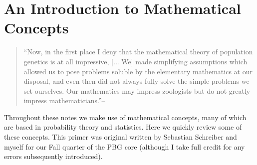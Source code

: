 % 
% 
% 


\chapter{An Introduction to Mathematical Concepts}
\begin{quote}
``Now, in the first place I deny that the mathematical theory of
population genetics is at all impressive, [... We] made simplifying assumptions which allowed us to pose problems
soluble by the elementary mathematics at our disposal, and even then
did not always fully solve the simple problems we set ourselves. Our
mathematics may impress zoologists but do not greatly impress
mathematicians.''--\citeauthor{haldane1964defense} 
\end{quote}

Throughout these notes we make use of mathematical concepts, many of
which are based in probability theory and statistics. Here we quickly
review some of these concepts. This primer was original written by
Sebastian Schreiber and myself for our Fall quarter of the PBG core
(although I take full credit for any errors subsequently introduced).



